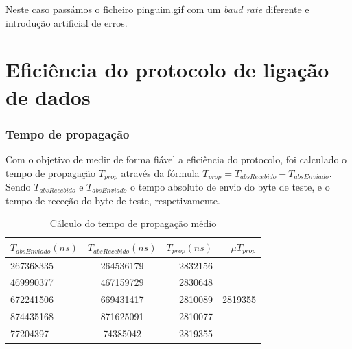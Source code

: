 \documentclass[11pt]{report}
\begin{document}
Neste caso passámos o ficheiro pinguim.gif com um \textit{baud rate} diferente e
introdução artificial de erros.

\chapter{Eficiência do protocolo de ligação de dados}

\subsection{Tempo de propagação}

Com o objetivo de medir de forma fiável a eficiência do protocolo, foi calculado
o tempo de propagação $T_{prop}$ através da fórmula
$T_{prop} = T_{absRecebido} - T_{absEnviado}$. Sendo $T_{absRecebido}$ e $T_{absEnviado}$ o tempo
absoluto de envio do byte de teste, e o tempo de receção do byte de teste, respetivamente.

\begin{table}[h!]
  \begin{center}
    \caption{Cálculo do tempo de propagação médio}
    \label{tab:table1}
    \begin{tabular}{l|c|r|r} %
        \textbf{$T_{absEnviado}(ns)$} &\textbf{$T_{absRecebido}(ns)$} & \textbf{$T_{prop}(ns)$} & \textbf{$\mu T_{prop}$}\\
      \hline
      267368335 & 264536179 & 2832156\\
      469990377 & 467159729 & 2830648\\
        672241506 & 669431417 & 2810089 & 2819355\\
      874435168 & 871625091 & 2810077\\
      77204397 & 74385042 & 2819355\\
    \end{tabular}
  \end{center}
\end{table}
\end{document}
